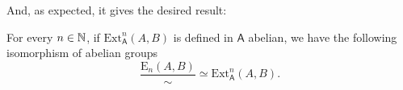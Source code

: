 And, as expected, it gives the desired result:
\begin{prop}
	For every $n \in \mathbb{N}$, if $\mathrm{Ext}^{ n}_{ \mathsf{A}} \left( A, B \right)$ is defined
	in $\mathsf{A}$ abelian,
	we have the following isomorphism of abelian groups
	\begin{equation}
		\frac{\mathrm{E}_n(A,B)}{\sim} \simeq
		\mathrm{Ext}^{ n}_{ \mathsf{A}} \left( A, B \right)
	.\end{equation} 
\end{prop} 
